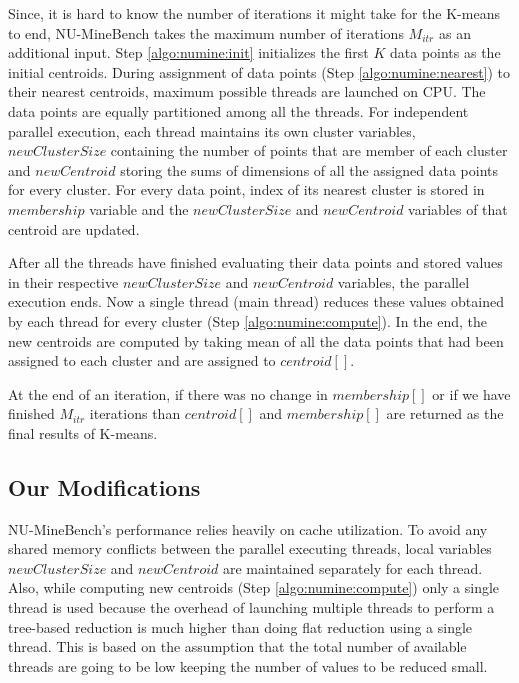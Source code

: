 Since, it is hard to know the number of iterations it might take for the K-means to end, NU-MineBench takes the maximum number of iterations $M_{itr}$ as an additional input. Step \ref{algo:numine:init} initializes the first $K$ data points as the initial centroids. During assignment of data points (Step \ref{algo:numine:nearest}) to their nearest centroids, maximum possible threads are launched on CPU. The data points are equally partitioned among all the threads. For independent parallel execution, each thread maintains its own cluster variables, $newClusterSize$ containing the number of points that are member of each cluster and $newCentroid$ storing the sums of dimensions of all the assigned data points for every cluster. For every data point, index of its nearest cluster is stored in $membership$ variable and the $newClusterSize$ and $newCentroid$ variables of that centroid are updated.
 
After all the threads have finished evaluating their data points and stored values in their respective $newClusterSize$ and $newCentroid$ variables, the parallel execution ends. Now a single thread (main thread) reduces these values obtained by each thread for every cluster (Step \ref{algo:numine:compute}). In the end, the new centroids are computed by taking mean of all the data points that had been assigned to each cluster and are assigned to $centroid[]$.

At the end of an iteration, if there was no change in $membership[]$ or if we have finished $M_{itr}$ iterations than $centroid[]$ and $membership[]$ are returned as the final results of K-means.

\subsection{Our Modifications}\label{sec:cpuMod}
NU-MineBench's performance relies heavily on cache utilization. To avoid any shared memory conflicts between the parallel executing threads, local variables $newClusterSize$ and $newCentroid$ are maintained separately for each thread. Also, while computing new centroids (Step \ref{algo:numine:compute}) only a single thread is used because the overhead of launching multiple threads to perform a tree-based reduction is much higher than doing flat reduction using a single thread. This is based on the assumption that the total number of available threads are going to be low keeping the number of values to be reduced small.

